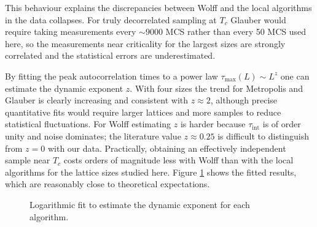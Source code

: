 This behaviour explains the discrepancies between Wolff and the local algorithms in the data collapses. For truly decorrelated sampling at $T_c$ Glauber would require taking measurements every $\sim9000$ MCS rather than every 50 MCS used here, so the measurements near criticality for the largest sizes are strongly correlated and the statistical errors are underestimated.


By fitting the peak autocorrelation times to a power law $\tau_{\max}(L)\sim L^z$ one can estimate the dynamic exponent $z$. With four sizes the trend for Metropolis and Glauber is clearly increasing and consistent with $z\approx2$, although precise quantitative fits would require larger lattices and more samples to reduce statistical fluctuations. For Wolff estimating $z$ is harder because $\tau_{\mathrm{int}}$ is of order unity and noise dominates; the literature value $z\approx0.25$ \citep{Wolff1989} is difficult to distinguish from $z=0$ with our data. Practically, obtaining an effectively independent sample near $T_c$ costs orders of magnitude less with Wolff than with the local algorithms for the lattice sizes studied here. Figure \ref{fig:tint-scaling} shows the fitted results, which are reasonably close to theoretical expectations.

\begin{figure}
  \centering
  
  \caption{Logarithmic fit to estimate the dynamic exponent for each algorithm.}
  \label{fig:tint-scaling}
\end{figure}